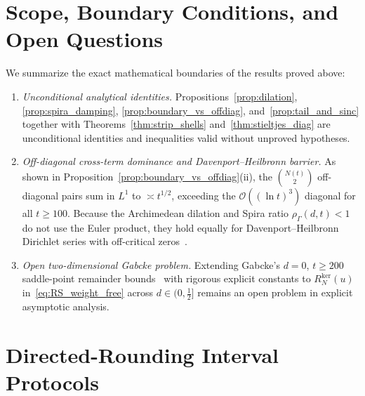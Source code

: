\documentclass[11pt,reqno]{amsart}
\theoremstyle{definition}
\theoremstyle{remark}
\numberwithin{equation}{section}
\begin{document}
\section{Scope, Boundary Conditions, and Open Questions}\label{sec:scope}

We summarize the exact mathematical boundaries of the results proved above:
\begin{enumerate}[label=\textup{(\arabic*)},leftmargin=2.2em]
\item \textit{Unconditional analytical identities.} Propositions~\ref{prop:dilation}, \ref{prop:spira_damping}, \ref{prop:boundary_vs_offdiag}, and~\ref{prop:tail_and_sinc} together with Theorems~\ref{thm:strip_shells} and~\ref{thm:stieltjes_diag} are unconditional identities and inequalities valid without unproved hypotheses.
\item \textit{Off-diagonal cross-term dominance and Davenport--Heilbronn barrier.} As shown in Proposition~\ref{prop:boundary_vs_offdiag}(ii), the $\binom{N(t)}{2}$ off-diagonal pairs sum in $L^1$ to $\asymp t^{1/2}$, exceeding the $\mathcal{O}((\ln t)^3)$ diagonal for all $t \ge 100$. Because the Archimedean dilation and Spira ratio $\rho_\Gamma(d,t) < 1$ do not use the Euler product, they hold equally for Davenport--Heilbronn Dirichlet series with off-critical zeros~\cite{davenportheilbronn1936}.
\item \textit{Open two-dimensional Gabcke problem.} Extending Gabcke's $d = 0$, $t \ge 200$ saddle-point remainder bounds~\cite{gabcke1979} with rigorous explicit constants to $R_N^{\mathrm{ker}}(u)$ in~\eqref{eq:RS_weight_free} across $d \in (0, \frac{1}{2}]$ remains an open problem in explicit asymptotic analysis.
\end{enumerate}

\appendix

\section{Directed-Rounding Interval Protocols}\label{app:interval}
\end{document}
